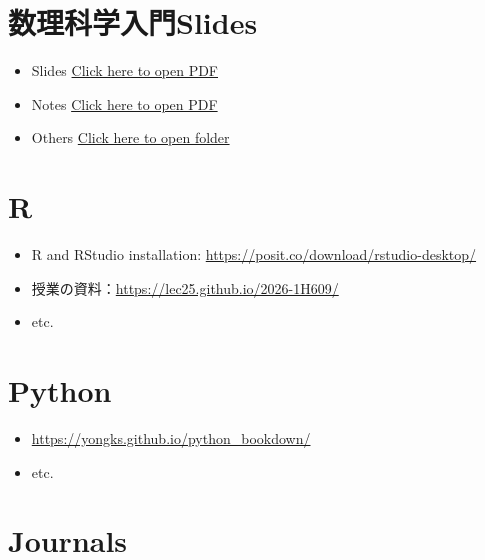 \documentclass[
]{book}
\providecommand{\tightlist}{%
  \setlength{\itemsep}{0pt}\setlength{\parskip}{0pt}}
\begin{document}
\section*{数理科学入門Slides}\label{ux6570ux7406ux79d1ux5b66ux5165ux9580slides}

\begin{itemize}
\tightlist
\item
  Slides \href{Stats-slides/allslides.pdf}{Click here to open PDF}
\item
  Notes \href{Stats-slides/allnotes.pdf}{Click here to open PDF}
\item
  Others \href{Stats-slides/.}{Click here to open folder}
\end{itemize}

\section*{R}\label{r}

\begin{itemize}
\tightlist
\item
  R and RStudio installation: \url{https://posit.co/download/rstudio-desktop/}
\item
  授業の資料：\url{https://lec25.github.io/2026-1H609/}
\item
  etc.
\end{itemize}

\section*{Python}\label{python}

\begin{itemize}
\tightlist
\item
  \url{https://yongks.github.io/python_bookdown/}
\item
  etc.
\end{itemize}

\section*{Journals}\label{journals}
\end{document}
